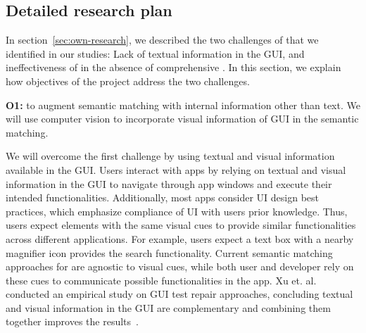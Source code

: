\subsection{Detailed research plan}
\label{sec:detailed-plan}

In section~\ref{sec:own-research}, we described the two challenges of \testreuse that we identified in our studies:
Lack of textual information in the GUI, and ineffectiveness of  \selector in the absence of comprehensive \tam. 
In this section, we explain how objectives of the \project project address the two challenges.

\bigskip 
\noindent
\textbf{O1:} to augment semantic matching with internal information other than text.  
We will use computer vision to incorporate visual information of GUI in the semantic matching.  

\smallskip
We will overcome the first challenge by using  textual and visual information available in the GUI.
Users interact with apps by relying on  textual and visual information in the GUI to navigate through app windows and execute their intended functionalities. 
Additionally, most apps consider UI design best practices, which emphasize compliance of UI with users prior knowledge.  
 Thus, users expect elements with the same visual cues to provide similar functionalities across different applications.
For example, users expect a text box with a nearby magnifier icon provides  the search functionality.
Current semantic matching approaches for \testreuse are agnostic to visual cues, while both user and developer rely on these cues to communicate possible functionalities in the app. 
Xu et. al. conducted an empirical study on GUI test repair approaches, concluding textual and visual information in the GUI are complementary and combining them together improves the results~\cite{Xu:GUIDER:ISSTA:2021}.




